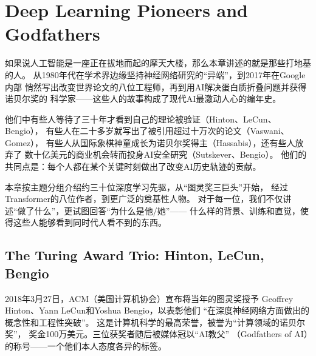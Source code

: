
\chapter{Deep Learning Pioneers and Godfathers}
\label{ch:pioneers}


如果说人工智能是一座正在拔地而起的摩天大楼，那么本章讲述的就是那些打地基的人。
从1980年代在学术界边缘坚持神经网络研究的``异端''，到2017年在Google内部
悄然写出改变世界论文的八位工程师，再到用AI解决蛋白质折叠问题并获得诺贝尔奖的
科学家——这些人的故事构成了现代AI最激动人心的编年史。

他们中有些人等待了三十年才看到自己的理论被验证（Hinton、LeCun、Bengio），
有些人在二十多岁就写出了被引用超过十万次的论文（Vaswani、Gomez），
有些人从国际象棋神童成长为诺贝尔奖得主（Hassabis），还有些人放弃了
数十亿美元的商业机会转而投身AI安全研究（Sutskever、Bengio）。
他们的共同点是：每个人都在某个关键时刻做出了改变AI历史轨迹的贡献。

本章按主题分组介绍约三十位深度学习先驱，从``图灵奖三巨头''开始，
经过Transformer的八位作者，到更广泛的奠基性人物。
对于每一位，我们不仅讲述``做了什么''，更试图回答``为什么是他/她''——
什么样的背景、训练和直觉，使得这些人能够看到同时代人看不到的东西。


\section{The Turing Award Trio: Hinton, LeCun, Bengio}
\label{sec:turing-trio}

2018年3月27日，ACM（美国计算机协会）宣布将当年的图灵奖授予
Geoffrey Hinton、Yann LeCun和Yoshua Bengio，以表彰他们
``在深度神经网络方面做出的概念性和工程性突破''。
这是计算机科学的最高荣誉，被誉为``计算领域的诺贝尔奖''，
奖金100万美元。三位获奖者随后被媒体冠以``AI教父''
（Godfathers of AI）的称号——一个他们本人态度各异的标签。

